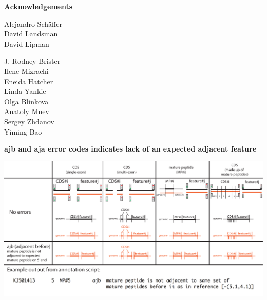 \documentclass[landscape]{slides}
\begin{document}
\begin{slide}

\large
\begin{center}
\large{\textbf{Acknowledgements}} \\

\normalsize
\vspace{0.5in}

Alejandro Sch\"{a}ffer \\
David Landsman \\
David Lipman

\vspace{0.5in}

J. Rodney Brister \\
Ilene Mizrachi \\
Eneida Hatcher \\
Linda Yankie \\
Olga Blinkova \\
Anatoly Mnev \\
Sergey Zhdanov \\ 
Yiming Bao \\

\end{center}

\vfill
\end{slide}
\begin{slide}
\begin{center}
\textbf{ajb and aja error codes indicates lack of an expected adjacent feature}
\vspace{0.5in}

\includegraphics[width=10in]{figs/errornew-4-ajb}
\end{center}
\vfill
\end{slide}
\end{document}
